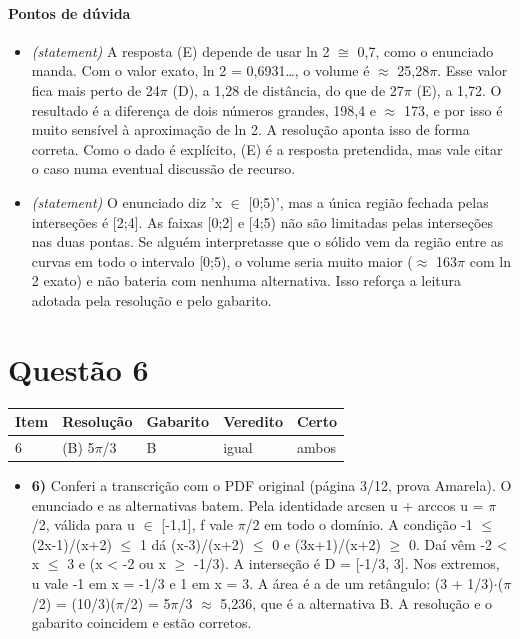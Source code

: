 \documentclass{article}%
\begin{document}
\paragraph{Pontos de dúvida}%
\begin{itemize}%
\item%
\textit{(statement)} A resposta (E) depende de usar ln 2 $\cong$ 0,7, como o enunciado manda. Com o valor exato, ln 2 = 0,6931\ldots{}, o volume é $\approx$ 25,28$\pi$. Esse valor fica mais perto de 24$\pi$ (D), a 1,28 de distância, do que de 27$\pi$ (E), a 1,72. O resultado é a diferença de dois números grandes, 198,4 e $\approx$ 173, e por isso é muito sensível à aproximação de ln 2. A resolução aponta isso de forma correta. Como o dado é explícito, (E) é a resposta pretendida, mas vale citar o caso numa eventual discussão de recurso.%
\item%
\textit{(statement)} O enunciado diz 'x $\in$ {[}0;5)', mas a única região fechada pelas interseções é {[}2;4{]}. As faixas {[}0;2{]} e {[}4;5) não são limitadas pelas interseções nas duas pontas. Se alguém interpretasse que o sólido vem da região entre as curvas em todo o intervalo {[}0;5), o volume seria muito maior ($\approx$ 163$\pi$ com ln 2 exato) e não bateria com nenhuma alternativa. Isso reforça a leitura adotada pela resolução e pelo gabarito.%
\end{itemize}%
\section*{Questão 6}%
\begin{longtable}{@{}p{} p{} p{} p{} p{}@{}}\toprule Item & Resolução & Gabarito & Veredito & Certo \\ \midrule
6 & (B) 5$\pi$/3 & B & igual & ambos \\
\bottomrule\end{longtable}%
\begin{itemize}%
\item%
\textbf{6)} Conferi a transcrição com o PDF original (página 3/12, prova Amarela). O enunciado e as alternativas batem. Pela identidade arcsen u + arccos u = $\pi$/2, válida para u $\in$ {[}{-}1,1{]}, f vale $\pi$/2 em todo o domínio. A condição {-}1 $\leq$ (2x{-}1)/(x+2) $\leq$ 1 dá (x{-}3)/(x+2) $\leq$ 0 e (3x+1)/(x+2) $\geq$ 0. Daí vêm {-}2 < x $\leq$ 3 e (x < {-}2 ou x $\geq$ {-}1/3). A interseção é D = {[}{-}1/3, 3{]}. Nos extremos, u vale {-}1 em x = {-}1/3 e 1 em x = 3. A área é a de um retângulo: (3 + 1/3)$\cdot$($\pi$/2) = (10/3)($\pi$/2) = 5$\pi$/3 $\approx$ 5,236, que é a alternativa B. A resolução e o gabarito coincidem e estão corretos.%
\end{itemize}%
\end{document}
